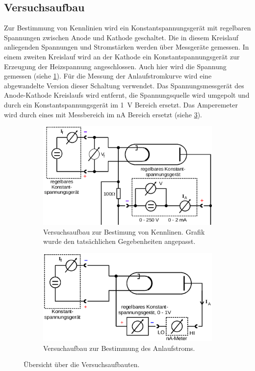 \subsection{Versuchsaufbau}
Zur Bestimmung von Kennlinien wird ein Konstantspannungsgerät mit regelbaren Spannungen
zwischen Anode und Kathode geschaltet. Die in diesem
Kreislauf anliegenden Spannungen und Stromstärken werden über Messgeräte gemessen.
In einem zweiten Kreislauf wird an der Kathode ein Konstantspannungsgerät zur Erzeugung
der Heizspannung angeschlossen. Auch hier wird die Spannung gemessen (siehe \ref{abb:7}).
Für die Messung der Anlaufstromkurve wird eine abgewandelte Version dieser Schaltung
verwendet. Das Spannungsmessgerät des Anode-Kathode
Kreislaufs wird entfernt, die Spannungsquelle wird umgepolt und durch ein Konstantspannungsgerät
im \SI{1}{\volt} Bereich ersetzt. Das Amperemeter wird durch eines mit Messbereich im \si{\nano\ampere}
Bereich ersetzt (siehe \ref{abb:8}).
\begin{figure}
\centering
  \begin{subfigure}{0.4\textwidth}
    \centering
    \includegraphics[width=\textwidth]{aufbken.png}
    \caption{Versuchsaufbau zur Bestimung von Kennlinen. Grafik wurde
    den tatsächlichen Gegebenheiten angepasst\cite{anleitung}.}
    \label{abb:7}
  \end{subfigure}
  \begin{subfigure}{0.4\textwidth}
    \centering
    \includegraphics[width=\textwidth]{aufbanl.png}
    \caption{Versuchaufbau zur Bestimmung des Anlaufstroms\cite{anleitung}.}
    \label{abb:8}
  \end{subfigure}
  \caption{Übersicht über die Versuchsaufbauten.}
\end{figure}
